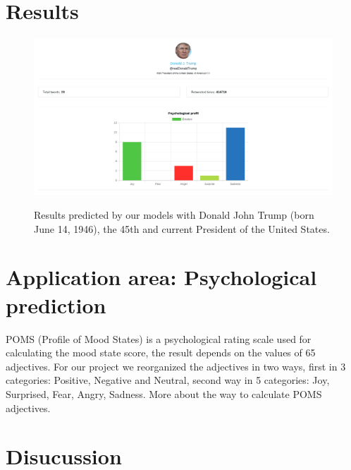 \documentclass{acmtog} %
\begin{document}
\section{Results}
\label{sub:results}

\begin{figure}[t]
{\includegraphics[height=0.5\textwidth]{Trump-results-analysis_exemple.png}}
\caption{Results predicted by our models with Donald John Trump (born June 14, 1946), the 45th and current President of the United States.}
  \label{fig:trump_results}
\end{figure}

\section{Application area: Psychological prediction }
\label{sec:application_area}

POMS (Profile of Mood States) is a psychological rating scale used for calculating the mood state score, the result depends on the values of 65 adjectives. For our project we reorganized the adjectives in two ways, first in 3 categories: Positive, Negative and Neutral, second way in 5 categories: Joy, Surprised, Fear, Angry, Sadness. More about the way to calculate POMS adjectives.

\section{Disucussion}
\label{sec:discussion}
\end{document}
